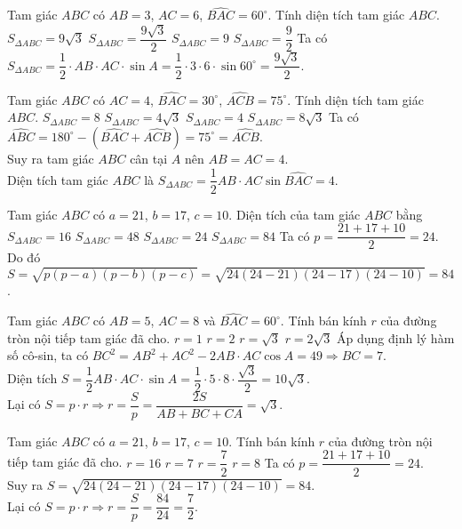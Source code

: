 \begin{ex}%
	Tam giác $ ABC$ có $ AB=3$, $AC=6$, $\widehat{BAC}=60^\circ $. Tính diện tích tam giác $ ABC$.
	\choice
	{$ S_{\Delta ABC}=9\sqrt{3}$}
	{\True $ S_{\Delta ABC}=\dfrac{9\sqrt{3}}{2}$}
	{$ S_{\Delta ABC}=9$}
	{$ S_{\Delta ABC}=\dfrac{9}{2}$}
	\loigiai
	{Ta có $ S_{\Delta ABC}=\dfrac{1}{2}\cdot AB\cdot AC\cdot \sin{A}=\dfrac{1}{2}\cdot 3\cdot 6\cdot \sin 60^\circ=\dfrac{9\sqrt{3}}{2}$.}
\end{ex}
\begin{ex}%
	Tam giác $ ABC$ có $ AC=4$, $\widehat{BAC}=30^\circ$, $\widehat{ACB}=75^\circ $. Tính diện tích tam giác $ ABC$.
	\choice
	{$ S_{\Delta ABC}=8$}
	{$ S_{\Delta ABC}=4\sqrt{3}$}
	{\True $ S_{\Delta ABC}=4$}
	{$ S_{\Delta ABC}=8\sqrt{3}$}
	\loigiai
	{Ta có $ \widehat{ABC}=180^\circ-(\widehat{BAC}+\widehat{ACB} )=75^\circ =\widehat{ACB}$.\\
		Suy ra tam giác $ ABC$ cân tại $ A$ nên $ AB=AC=4$.\\
		Diện tích tam giác $ ABC$ là $ S_{\Delta ABC}=\dfrac{1}{2}AB\cdot AC\sin \widehat{BAC}=4$.}
\end{ex}
\begin{ex}%
	Tam giác $ ABC$ có $ a=21$, $b=17$, $c=10$. Diện tích của tam giác $ ABC$ bằng
	\choice
	{$ S_{\Delta ABC}=16$}
	{$ S_{\Delta ABC}=48$}
	{$ S_{\Delta ABC}=24$}
	{\True $ S_{\Delta ABC}=84$}
	\loigiai
	{Ta có $ p=\dfrac{21+17+10}{2}=24$.\\
		Do đó $ S=\sqrt{p(p-a )(p-b )(p-c )}=\sqrt{24(24-21 )(24-17 )(24-10 )}=84$.}
\end{ex}

\begin{ex}%
	Tam giác $ ABC$ có $ AB=5$, $AC=8$ và $ \widehat{BAC}=60^\circ$. Tính bán kính $ r$ của đường tròn nội tiếp tam giác đã cho.
	\choice
	{$ r=1$}
	{$ r=2$}
	{\True $ r=\sqrt{3}$}
	{$ r=2\sqrt{3}$}
	\loigiai
	{Áp dụng định lý hàm số cô-sin, ta có
		$ BC^2=AB^2+AC^2-2AB\cdot AC\cos A=49\Rightarrow BC=7$.\\
		Diện tích $ S=\dfrac{1}{2}AB\cdot AC\cdot \sin A=\dfrac{1}{2}\cdot 5\cdot 8\cdot \dfrac{\sqrt{3}}{2}=10\sqrt{3}$.\\
		Lại có $ S=p\cdot r\Rightarrow r=\dfrac{S}{p}=\dfrac{2S}{AB+BC+CA}=\sqrt{3}$.}
\end{ex}
\begin{ex}%
	Tam giác $ ABC$ có $ a=21$, $b=17$, $c=10$. Tính bán kính $ r$ của đường tròn nội tiếp tam giác đã cho.
	\choice
	{$ r=16$}
	{$ r=7$}
	{\True $ r=\dfrac{7}{2}$}
	{$ r=8$}
	\loigiai
	{Ta có $ p=\dfrac{21+17+10}{2}=24$.\\
		Suy ra $ S=\sqrt{24(24-21 )(24-17 )(24-10 )}=84$.\\
		Lại có $ S=p\cdot r\Rightarrow r=\dfrac{S}{p}=\dfrac{84}{24}=\dfrac{7}{2}$.}
\end{ex}

